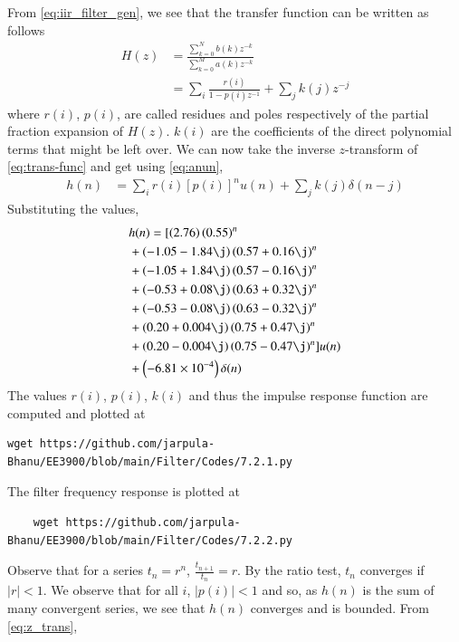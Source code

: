 \documentclass[journal,12pt,twocolumn]{IEEEtran}
\renewcommand\thesection{\arabic{section}}
\begin{document}
\begin{enumerate}[label=\thesection.\arabic*]
From \eqref{eq:iir_filter_gen}, we see that the transfer function can be written as follows
\begin{align}
	H(z) &= \frac{\sum_{k = 0}^{N}b(k)z^{-k}}{\sum_{k = 0}^{M}a(k)z^{-k}} \\
		 &= \sum_{i}\frac{r(i)}{1 - p(i)z^{-1}} + \sum_{j}k(j)z^{-j}
	\label{eq:trans-func}
\end{align}
where $r(i)$, $p(i)$, are called residues and poles respectively of the partial 
fraction expansion of $H(z)$. $k(i)$ are the coefficients of the direct polynomial 
terms that might be left over. We can now take the inverse $z$-transform of
\eqref{eq:trans-func} and get using \eqref{eq:anun},
\begin{align}
	h(n) &= \sum_{i}r(i)[p(i)]^nu(n) + \sum_{j}k(j)\delta(n - j)
	\label{eq:h-n-expr}
\end{align}
Substituting the values,
\begin{align}
	&h(n) = [\brak{2.76}\brak{0.55}^n \nonumber \\ 
	&+ \brak{-1.05-1.84\j}\brak{0.57+0.16\j}^n \nonumber \\
	&+ \brak{-1.05+1.84\j}\brak{0.57-0.16\j}^n \nonumber \\
	&+ \brak{-0.53+0.08\j}\brak{0.63+0.32\j}^n \nonumber \\
	&+ \brak{-0.53-0.08\j}\brak{0.63-0.32\j}^n \nonumber \\
	&+ \brak{0.20+0.004\j}\brak{0.75+0.47\j}^n \nonumber \\
	&+ \brak{0.20-0.004\j}\brak{0.75-0.47\j}^n]u(n) \nonumber \\
	&+ \brak{-6.81 \times 10^{-4}}\delta(n)
\end{align}
The values $r(i)$, $p(i)$, $k(i)$ and thus the impulse response function are computed and plotted at
\begin{lstlisting}
wget https://github.com/jarpula-Bhanu/EE3900/blob/main/Filter/Codes/7.2.1.py
\end{lstlisting}
The filter frequency response is plotted at
\begin{lstlisting}
	wget https://github.com/jarpula-Bhanu/EE3900/blob/main/Filter/Codes/7.2.2.py
\end{lstlisting}
Observe that for a series $t_n = r^n$, $\frac{t_{n + 1}}{t_n} = r$.
By the ratio test, $t_n$ converges if $|r| < 1$. We observe that for all $i$, 
$|p(i)| < 1$ and so, as $h(n)$ is the sum of many convergent series,
we see that $h(n)$ converges and is bounded. From \eqref{eq:z_trans},
\begin{align}

\end{align}
\end{enumerate}
\end{document}
